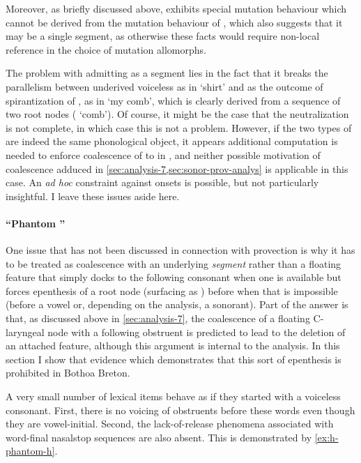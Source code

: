 Moreover, as briefly discussed above, \ipa{[r̥]} exhibits special mutation behaviour which cannot be derived from the mutation behaviour of \ipa{[h]}, which also suggests that it may be a single segment, as otherwise these facts would require non\hyp local reference in the choice of mutation allomorphs.

The problem with admitting \ipa{[r̥]} as a segment lies in the fact that it breaks the parallelism between underived voiceless \ipa{[r̥]} as in \ipa{[r̥ɔʃəd̥]} `shirt' and \ipa{[r̥]} as the outcome of spirantization of \ipa{[kr]}, as in \ipa{[mə ˈhriːb̥]} `my comb', which is clearly derived from a sequence of two root nodes (\ipa{[ˈkriːb̥]} `comb'). Of course, it might be the case that the neutralization is not complete, in which case this is not a problem. However, if the two types of \ipa{[r̥]} are indeed the same phonological object, it appears additional computation is needed to enforce coalescence of \ipa{[hr]} to \ipa{[r̥]} in \ipa{[mə ˈr̥iːb̥]}, and neither possible motivation of coalescence adduced in \cref{sec:analysis-7,sec:sonor-prov-analys} is applicable in this case. An \emph{ad hoc} constraint against \ipa{[hr]} onsets is possible, but not particularly insightful. I leave these issues aside here.


\paragraph{\enquote{Phantom \ipa{[h]}}}
\label{sec:phantom-h}

One issue that has not been discussed in connection with provection is why it has to be treated as coalescence with an underlying \emph{segment} \ipa{[h]} rather than a floating  feature that simply docks to the following consonant when one is available but forces epenthesis of a root node (surfacing as \ipa{[h]}) before when that is impossible (before a vowel or, depending on the analysis, a sonorant). Part of the answer is that, as discussed above in \cref{sec:analysis-7}, the coalescence of a floating C-laryngeal node with a following obstruent is predicted to lead to the deletion of an attached  feature, although this argument is internal to the analysis. In this section I show that evidence which demonstrates that this sort of epenthesis is prohibited in Bothoa Breton.

A very small number of lexical items behave as if they started with a voiceless consonant. First, there is no voicing of obstruents before these words even though they are vowel-initial. Second, the lack\hyp of\hyp release phenomena associated with word-final nasal\endash stop sequences are also absent. This is demonstrated by \cref{ex:h-phantom-h}.


